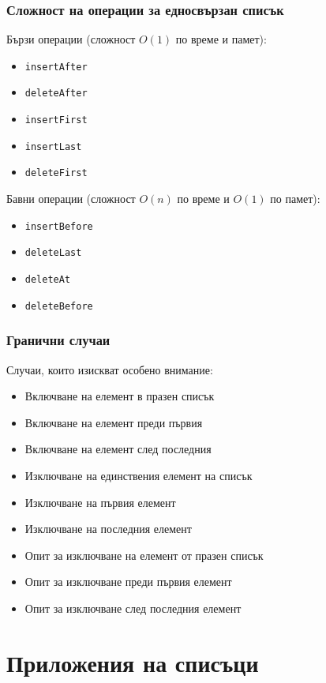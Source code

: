 \documentclass[alsotrans]{beamerswitch}
\begin{document}
\begin{frame}
  \frametitle{Сложност на операции за едносвързан списък}
  Бързи операции (сложност $O(1)$ по време и памет):
  \begin{itemize}
  \item \tt{insertAfter}
  \item \tt{deleteAfter}
  \item \tt{insertFirst}
  \item \tt{insertLast}
  \item \tt{deleteFirst}
  \end{itemize}
  \pause
  Бавни операции (сложност $O(n)$ по време и $O(1)$ по памет):
  \begin{itemize}
  \item \tt{insertBefore}
  \item \tt{deleteLast}
  \item \tt{deleteAt}
  \item \tt{deleteBefore}
  \end{itemize}
\end{frame}

\begin{frame}
  \frametitle{Гранични случаи}
  Случаи, които изискват особено внимание:
  \begin{itemize}[<+->]
  \item Включване на елемент в празен списък
  \item Включване на елемент преди първия
  \item Включване на елемент след последния
  \item Изключване на единствения елемент на списък
  \item Изключване на първия елемент
  \item Изключване на последния елемент
  \item Опит за изключване на елемент от празен списък
  \item Опит за изключване преди първия елемент
  \item Опит за изключване след последния елемент
  \end{itemize}
\end{frame}

\section{Приложения на списъци}
\end{document}
